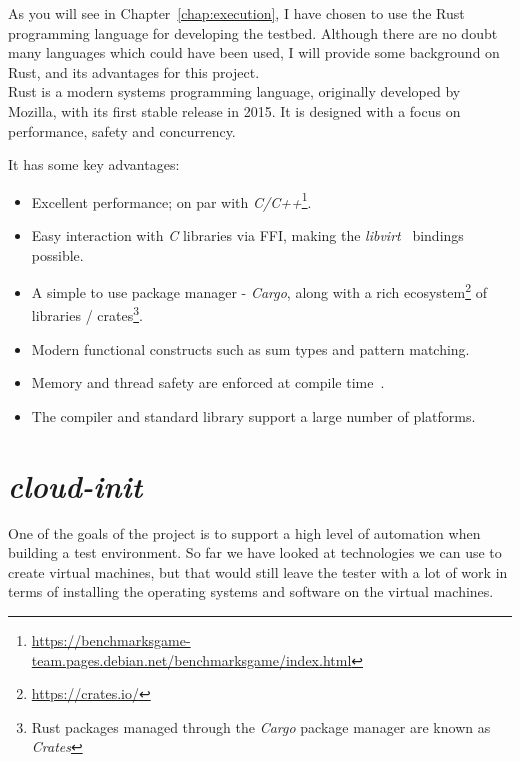 \documentclass[
    author={Jacob Daniel Halsey},
    supervisor={Prof. Awais Rashid},
    degree={BSc},
    title={Building a Testbed for Evaluating Privacy Enhancing Technologies  (PETs)},
    subtitle={},
    type={software development},
    year={2021}
]{dissertation}
\begin{document}
As you will see in Chapter~\ref{chap:execution}, I have chosen to use the Rust programming
language for developing the testbed. Although there are no doubt many languages which
could have been used, I will provide some background on Rust, and its advantages for this
project. \\

Rust is a modern systems programming language, originally developed by Mozilla, 
with its first stable release in 2015. It is designed with a focus on performance, safety
and concurrency. \\

\begin{singlespace}
	It has some key advantages:
	\begin{itemize}
		\item Excellent performance; on par with
		 \emph{C/C++}\footnote{\url{https://benchmarksgame-team.pages.debian.net/benchmarksgame/index.html}}.
		\item Easy interaction with \emph{C} libraries via FFI, making 
		the \emph{libvirt}~\cite{libvirt_rust} bindings possible.
		\item A simple to use package manager - \emph{Cargo},
		along with a rich ecosystem\footnote{\url{https://crates.io/}} of 
		libraries / crates\footnote{Rust packages 
			managed through the \emph{Cargo} package
				manager are known as \emph{Crates}}.
		\item Modern functional constructs such as sum types and pattern matching.
		\item Memory and thread safety are enforced at compile time~\cite{systems_rust}.
		\item The compiler and standard library support a large number of platforms.
	\end{itemize}
\end{singlespace}

\section{\emph{cloud-init}}
\label{sect:cloud-init-background}

One of the goals of the project is to support a high level of automation when building a 
test environment. So far we have looked at technologies we can use to create virtual machines,
but that would still leave the tester with a lot of work in terms of installing the operating
systems and software on the virtual machines. \\
\end{document}
